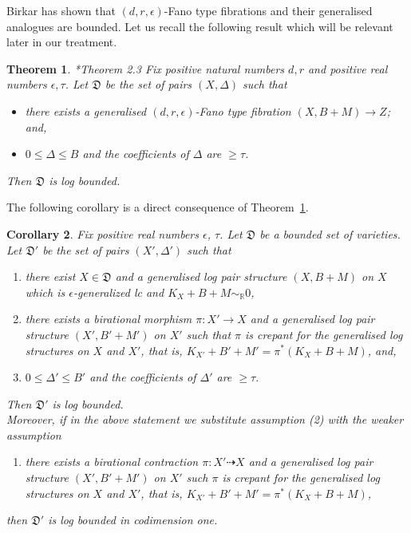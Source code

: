 \documentclass[11pt]{ip-journal}
\newtheorem{theorem}{Theorem}[section]
\newtheorem{corollary}[theorem]{Corollary}
\theoremstyle{definition}
\begin{document}
Birkar has shown that 
$(d,r,\epsilon)$-Fano 
type fibrations and their generalised analogues are bounded. 
Let us recall the following result which will be relevant later in our treatment.

\begin{theorem}
\cite{1811.107092}*{Theorem 2.3}
\label{bir.bound.fibr.thm}
Fix positive natural numbers $d,r$ 
and positive real numbers 
$\epsilon, \tau$. 
Let 
$\mathfrak{D}$ 
be the set of pairs
$(X, \Delta)$ 
such that 
\begin{itemize}
\item 
there exists a generalised 
$(d,r,\epsilon)$-Fano 
type fibration
$(X, B+M) \to Z$; and, 
\item 
$0 \leq \Delta \leq B$ 
and the coefficients of 
$\Delta$ 
are 
$\geq \tau$.
\end{itemize}
Then $\mathfrak D$ is log bounded.
\end{theorem}


The following corollary is a direct consequence of Theorem~\ref{bir.bound.fibr.thm}.

\begin{corollary}
\label{bir.bound.fibr.cor}
Fix positive real numbers 
$\epsilon$, 
$\tau$.
Let 
$\mathfrak D$ 
be a bounded set of varieties.
Let 
$\mathfrak D'$ 
be the set of pairs
$(X', \Delta')$ 
such that 
\begin{enumerate}
\item 
there exist 
$X \in \mathfrak D$ 
and a generalised log pair structure
$(X, B+M)$
on 
$X$
which 
is $\epsilon$-generalized lc and 
$K_X+B+M \sim_\mathbb{R} 0$,

\item 
there exists a birational morphism 
$\pi \colon X' \to X$
and a generalised log pair structure
$(X', B'+M')$
on
$X'$
such that
$\pi$
is crepant for the generalised log structures 
on
$X$
and
$X'$, 
that is, 
$K_{X'}+B'+M'=\pi^\ast(K_X+B+M)$, and,

\item 
$0 \leq \Delta' \leq B'$ 
and the coefficients of 
$\Delta'$ 
are 
$\geq \tau$.
\end{enumerate}
Then 
$\mathfrak D'$ 
is log bounded.
\\
Moreover, if in the above statement we substitute assumption (2)
with the weaker assumption
\begin{enumerate}
\item[(2')]
there exists a birational contraction
$\pi \colon X' \dashrightarrow X$
and a generalised log pair structure
$(X', B'+M')$
on
$X'$
such 
$\pi$
is crepant for the generalised log structures 
on
$X$
and
$X'$, 
that is, 
$K_{X'}+B'+M'=\pi^\ast(K_X+B+M)$,
\end{enumerate}
then
$\mathfrak D'$ 
is log bounded in codimension one.
\end{corollary}
\end{document}
